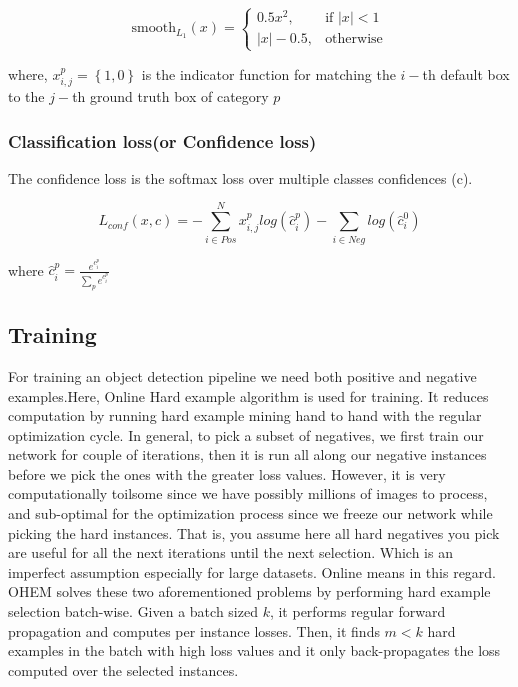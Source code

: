 \documentclass{article}
\begin{document}
\[
    \text{smooth}_{L_{1}}(x)= 
\begin{cases}
    0.5x^{2},& \text{if } |x| < 1\\
    |x|-0.5,              & \text{otherwise}
\end{cases}
\]

where, $x_{i,j}^{p}=\left\{ 1,0\right\}$ is the indicator function for matching the $i-$th default box to the $j-$th ground truth box of category $p$

\subsubsection{Classification loss(or Confidence loss)}

The confidence loss is the softmax loss over multiple classes confidences (c).

\begin{equation}
L_{conf}(x,c)=-\sum_{i \in Pos}^{N}x_{i,j}^{p}log(\hat{c}_{i}^{p})-\sum_{i \in Neg}log(\hat{c}_{i}^{0})
\end{equation}

where $\hat{c}_{i}^{p}=\frac{e^{c_{i}^{p}}}{\sum_{p}e^{c_{i}^{p}}}$

\subsection{Training}

For training an object detection pipeline we need both positive and negative examples.Here, 
Online Hard example algorithm \cite{shrivastava2016training} is used for training. It reduces computation by running hard example mining hand to hand with the regular optimization cycle. In general, to pick a subset of negatives, we first train our network for couple of iterations, then it is run all along our negative instances before we pick the ones with the greater loss values. However, it is very computationally toilsome since we have possibly millions of images to process, and sub-optimal for the optimization process since we freeze our network while picking the hard instances. That is, you assume here all hard negatives you pick are useful for all the next iterations until the next selection. Which is an imperfect assumption especially for large datasets. Online means in this regard. OHEM solves these two aforementioned problems by performing hard example selection batch-wise. Given a batch sized $k$, it performs regular forward propagation and computes per instance losses. Then, it finds $m < k$ hard examples in the batch with high loss values and it only back-propagates the loss computed over the  selected instances.
\end{document}

